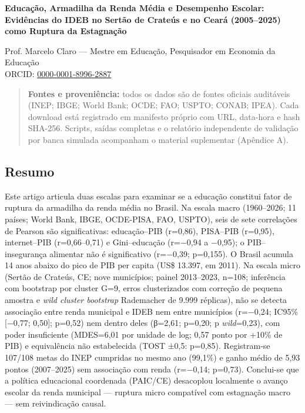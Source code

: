 \documentclass[
  brazilian,
  12pt,
  a4paper,
]{article}
\author{}
\date{}
\begin{document}
\begin{center}
{\Large\bfseries Educação, Armadilha da Renda Média e Desempenho Escolar:}\\[4pt]
{\large\bfseries Evidências do IDEB no Sertão de Crateús e no Ceará (2005–2025)\\ como Ruptura da Estagnação}
\end{center}

\begin{center}
\small Prof. Marcelo Claro --- Mestre em Educação, Pesquisador em Economia da Educação\\
\small ORCID: \href{https://orcid.org/0000-0001-8996-2887}{0000-0001-8996-2887}
\end{center}

\begin{quote}
\textbf{Fontes e proveniência:} todos os dados são de fontes oficiais
auditáveis (INEP; IBGE; World Bank; OCDE; FAO; USPTO; CONAB; IPEA). Cada
download está registrado em manifesto próprio com URL, data-hora e hash
SHA-256. Scripts, saídas completas e o relatório independente de
validação por banca simulada acompanham o material suplementar (Apêndice
A).
\end{quote}

\subsection{Resumo}\label{resumo}

Este artigo articula duas escalas para examinar se a educação constitui
fator de ruptura da armadilha da renda média no Brasil. Na escala macro
(1960--2026; 11 países; World Bank, IBGE, OCDE-PISA, FAO, USPTO), seis
de sete correlações de Pearson são significativas: educação--PIB
(r=0,86), PISA--PIB (r=0,95), internet--PIB (r=0,66--0,71) e
Gini--educação (r=−0,94 a −0,95); o PIB--insegurança alimentar não é
significativo (r=−0,39; p=0,155). O Brasil acumula 14 anos abaixo do
pico de PIB per capita (US\$ 13.397, em 2011). Na escala micro (Sertão
de Crateús, CE; nove municípios; painel 2013--2023, n=108; inferência
com bootstrap por cluster G=9, erros clusterizados com correção de
pequena amostra e \emph{wild cluster bootstrap} Rademacher de 9.999
réplicas), não se detecta associação entre renda municipal e IDEB nem
entre municípios (r=−0,24; IC95\% {[}−0,77; 0,50{]}; p=0,52) nem dentro
deles (β=2,61; p=0,20; p \emph{wild}=0,23), com poder insuficiente
(MDES=6,01 por unidade de log; 0,57 ponto por +10\% de PIB) e
equivalência não estabelecida (TOST ±0,5: p=0,85). Registram-se 107/108
metas do INEP cumpridas no mesmo ano (99,1\%) e ganho médio de 5,93
pontos (2007--2025) sem associação com renda (r=−0,14; p=0,73).
Conclui-se que a política educacional coordenada (PAIC/CE) desacoplou
localmente o avanço escolar da renda municipal --- ruptura micro
compatível com estagnação macro --- sem reivindicação causal.
\end{document}
